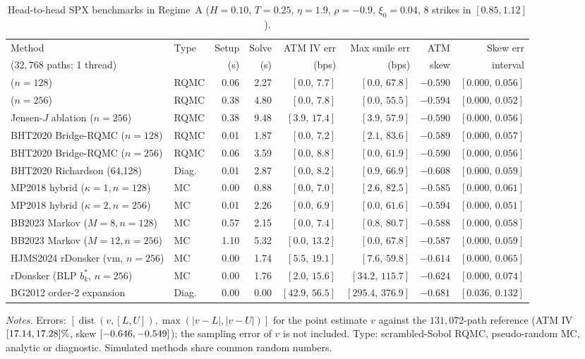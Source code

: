 \begin{table}[t]
\centering
\caption{Head-to-head SPX benchmarks in Regime~A ($H=0.10$, $T=0.25$, $\eta=1.9$, $\rho=-0.9$, $\xi_0=0.04$, $8$ strikes in $[0.85,1.12]$).}
\label{tab:e4_regimeA}
\footnotesize
\setlength{\tabcolsep}{3.6pt}
\begin{tabular}{@{}llrrrrrr@{}}
\toprule
Method & Type & Setup & Solve & ATM IV err & Max smile err & ATM & Skew err \\
($32{,}768$ paths; 1 thread) & & (s) & (s) & (bps) & (bps) & skew & interval \\
\midrule
\RCCE{} ($n=128$) & RQMC & 0.06 & 2.27 & $[0.0,\,7.7]$ & $[0.0,\,67.8]$ & $-0.590$ & $[0.000,\,0.056]$ \\
\RCCE{} ($n=256$) & RQMC & 0.38 & 4.80 & $[0.0,\,7.8]$ & $[0.0,\,55.5]$ & $-0.594$ & $[0.000,\,0.052]$ \\
Jensen-$J$ ablation ($n=256$) & RQMC & 0.38 & 9.48 & $[3.9,\,17.4]$ & $[3.9,\,57.9]$ & $-0.590$ & $[0.000,\,0.056]$ \\
BHT2020 Bridge-RQMC ($n=128$) & RQMC & 0.01 & 1.87 & $[0.0,\,7.2]$ & $[2.1,\,83.6]$ & $-0.589$ & $[0.000,\,0.057]$ \\
BHT2020 Bridge-RQMC ($n=256$) & RQMC & 0.06 & 3.59 & $[0.0,\,8.8]$ & $[0.0,\,61.9]$ & $-0.590$ & $[0.000,\,0.056]$ \\
BHT2020 Richardson (64,128) & Diag. & 0.01 & 2.87 & $[0.0,\,8.2]$ & $[0.9,\,66.9]$ & $-0.608$ & $[0.000,\,0.059]$ \\
MP2018 hybrid ($\kappa=1,n=128$) & MC & 0.00 & 0.88 & $[0.0,\,7.0]$ & $[2.6,\,82.5]$ & $-0.585$ & $[0.000,\,0.061]$ \\
MP2018 hybrid ($\kappa=2,n=256$) & MC & 0.01 & 2.26 & $[0.0,\,6.9]$ & $[0.0,\,61.6]$ & $-0.594$ & $[0.000,\,0.051]$ \\
BB2023 Markov ($M=8,n=128$) & MC & 0.57 & 2.15 & $[0.0,\,7.4]$ & $[0.8,\,80.7]$ & $-0.588$ & $[0.000,\,0.058]$ \\
BB2023 Markov ($M=12,n=256$) & MC & 1.10 & 5.32 & $[0.0,\,13.2]$ & $[0.0,\,67.8]$ & $-0.587$ & $[0.000,\,0.059]$ \\
HJMS2024 rDonsker (vm, $n=256$) & MC & 0.00 & 1.74 & $[5.5,\,19.1]$ & $[7.6,\,59.8]$ & $-0.614$ & $[0.000,\,0.065]$ \\
rDonsker (BLP $b_k^*$, $n=256$) & MC & 0.00 & 1.76 & $[2.0,\,15.6]$ & $[34.2,\,115.7]$ & $-0.624$ & $[0.000,\,0.074]$ \\
BG2012 order-2 expansion & Diag. & 0.00 & 0.00 & $[42.9,\,56.5]$ & $[295.4,\,376.9]$ & $-0.681$ & $[0.036,\,0.132]$ \\
\bottomrule
\end{tabular}
\par\smallskip
\parbox{\linewidth}{\footnotesize\emph{Notes.} Errors: $[\operatorname{dist}(v,[L,U]),\max(|v-L|,|v-U|)]$ for the point estimate $v$ against the $131{,}072$-path \RCBridge{} reference (ATM IV $[17.14,17.28]\%$, skew $[-0.646,-0.549]$); the sampling error of $v$ is not included. Type: scrambled-Sobol RQMC, pseudo-random MC, analytic or diagnostic. Simulated methods share common random numbers.}
\end{table}
